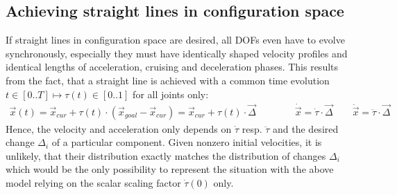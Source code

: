 \documentclass[11pt,english]{article}
\begin{document}
\subsection{Achieving straight lines in configuration space}
If straight lines in configuration space are desired, all DOFs even have to
evolve synchronously, especially they must have identically shaped velocity
profiles and identical lengths of acceleration, cruising and deceleration
phases. This results from the fact, that a straight line is achieved with a
common time evolution $t \in [0..T] \mapsto \tau(t)\in[0..1]$ for all joints
only:
\begin{gather*}
  \vec{x}(t) = \vec{x}_{cur} + \tau(t) \cdot (\vec{x}_{goal} - \vec{x}_{cur})
  = \vec{x}_{cur} + \tau(t) \cdot \vec{\Delta} \qquad\qquad
  \dot{\vec{x}} = \dot{\tau} \cdot \vec{\Delta} \qquad
  \ddot{\vec{x}} = \ddot{\tau} \cdot \vec{\Delta}
\end{gather*}
Hence, the velocity and acceleration only depends on $\dot\tau$ resp.
$\ddot\tau$ and the desired change $\Delta_i$ of a particular component. Given
nonzero initial velocities, it is unlikely, that their distribution exactly
matches the distribution of changes $\Delta_i$ which would be the only
possibility to represent the situation with the above model relying
on the scalar scaling factor $\dot\tau(0)$ only.
\end{document}
